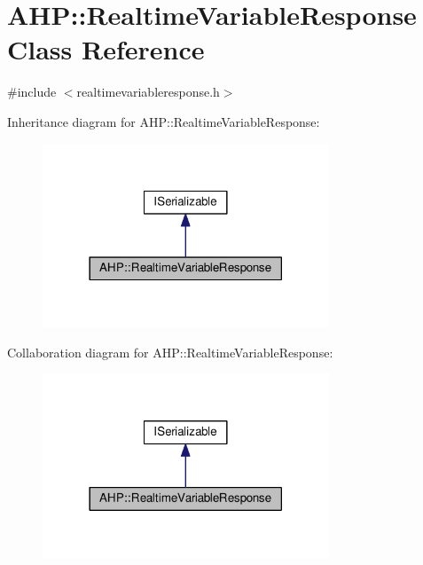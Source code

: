 \hypertarget{class_a_h_p_1_1_realtime_variable_response}{}\section{A\+H\+P\+:\+:Realtime\+Variable\+Response Class Reference}
\label{class_a_h_p_1_1_realtime_variable_response}


{\ttfamily \#include $<$realtimevariableresponse.\+h$>$}



Inheritance diagram for A\+H\+P\+:\+:Realtime\+Variable\+Response\+:
\nopagebreak
\begin{figure}[H]
\begin{center}
\leavevmode
\includegraphics[width=242pt]{class_a_h_p_1_1_realtime_variable_response__inherit__graph}
\end{center}
\end{figure}


Collaboration diagram for A\+H\+P\+:\+:Realtime\+Variable\+Response\+:
\nopagebreak
\begin{figure}[H]
\begin{center}
\leavevmode
\includegraphics[width=242pt]{class_a_h_p_1_1_realtime_variable_response__coll__graph}
\end{center}
\end{figure}
